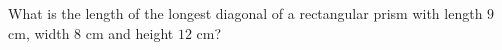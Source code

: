 What is the length of the longest diagonal of a rectangular prism with length $9$ cm, width $8$ cm and height $12$ cm?
